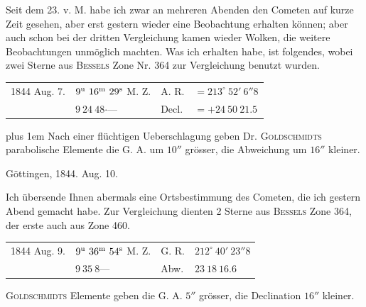 Seit dem 23. v. M. habe ich zwar an mehreren Abenden den Cometen auf kurze Zeit gesehen, aber erst gestern wieder eine Beobachtung erhalten können; aber auch schon bei der dritten Vergleichung kamen wieder Wolken, die weitere Beobachtungen unmöglich machten. Was ich erhalten habe, ist folgendes, wobei zwei Sterne aus \textsc{Bessels} Zone Nr. 364 zur Vergleichung benutzt wurden.

\begin{center}
\setlength{\tabcolsep}{3pt}
\begin{tabular}{llll}
1844 Aug. 7. & $9^{\rm u}\ 16^{\rm m}\ 29^{\rm s}$ M. Z. & A. R. & $=213^\circ\ 52'\ 6''8$ \\
 & $9\ 24\ 48\mathord{\cdot}$\quad --- & Decl. & $=+24\ 50\ 21.5$ \\
\end{tabular}
\end{center}

{\rightskip=0pt plus 1em Nach einer flüchtigen Ueberschlagung geben Dr. \textsc{Goldschmidts} parabolische Elemente die G. A. um $10''$ grösser, die Abweichung um $16''$ kleiner.\par}

\begin{flushright}Göttingen, 1844. Aug. 10.\end{flushright}

Ich übersende Ihnen abermals eine Ortsbestimmung des Cometen, die ich gestern Abend gemacht habe. Zur Vergleichung dienten 2 Sterne aus \textsc{Bessels} Zone 364, der erste auch aus Zone 460.

\begin{center}
\setlength{\tabcolsep}{3pt}
\begin{tabular}{llll}
1844 Aug. 9. & $9^{\rm u}\ 36^{\rm m}\ 54^{\rm s}$ M. Z. & G. R. & $212^\circ\ 40'\ 23''8$ \\
 & $9\ 35\ 8$\quad --- & Abw. & $23\ 18\ 16.6$ \\
\end{tabular}
\end{center}

\textsc{Goldschmidts} Elemente geben die G. A. $5''$ grösser, die Declination $16''$ kleiner.
